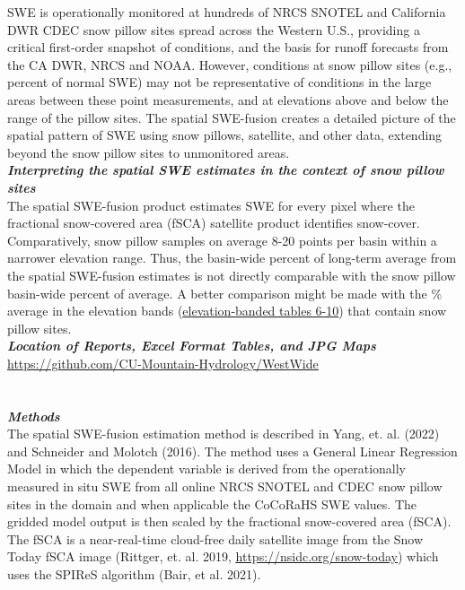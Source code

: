 \documentclass{article}
\begin{document}
\noindent SWE is operationally monitored at hundreds of NRCS SNOTEL and California DWR CDEC snow pillow sites spread across the Western U.S., providing a critical first-order snapshot of conditions, and the basis for runoff forecasts from the CA DWR, NRCS and NOAA. However, conditions at snow pillow sites (e.g., percent of normal SWE) may not be representative of conditions in the large areas between these point measurements, and at elevations above and below the range of the pillow sites. The spatial SWE-fusion creates a detailed picture of the spatial pattern of SWE using snow pillows, satellite, and other data, extending beyond the snow pillow sites to unmonitored areas.\\

\fontsize{12}{16}
\noindent\textbf{\textit{Interpreting the spatial SWE estimates in the context of snow pillow sites}}\\
\fontsize{10}{14}
\noindent The spatial SWE-fusion product estimates SWE for every pixel where the fractional snow-covered area (fSCA) satellite product identifies snow-cover. Comparatively, snow pillow samples on average 8-20 points per basin within a narrower elevation range. Thus, the basin-wide percent of long-term average from the spatial SWE-fusion estimates is not directly comparable with the snow pillow basin-wide percent of average. A better comparison might be made with the \% average in the elevation bands (\href{https://github.com/CU-Mountain-Hydrology/WestWide}{\underline{elevation-banded tables 6-10}}) that contain snow pillow sites.\\

\fontsize{12}{16}
\noindent\textbf{\textit{Location of Reports, Excel Format Tables, and JPG Maps}}\\
\fontsize{10}{14}
\noindent \href{https://github.com/CU-Mountain-Hydrology/WestWide}{\underline{https://github.com/CU-Mountain-Hydrology/WestWide}}

\section*{}\label{sec:methods}\vspace{-3em}
\fontsize{12}{16}
\noindent\textbf{\textit{Methods}}\\
\fontsize{10}{14}
\noindent The spatial SWE-fusion estimation method is described in Yang, et. al. (2022) and Schneider and Molotch (2016). The method uses a General Linear Regression Model in which the dependent variable is derived from the operationally measured in situ SWE from all online NRCS SNOTEL and CDEC snow pillow sites in the domain and when applicable the CoCoRaHS SWE values. The gridded model output is then scaled by the fractional snow-covered area (fSCA). The fSCA is a near-real-time cloud-free daily satellite image from the Snow Today fSCA image (Rittger, et. al. 2019, \href{https://nsidc.org/snow-today}{\underline{https://nsidc.org/snow-today}}) which uses the SPIReS algorithm (Bair, et al. 2021).\\
\end{document}
